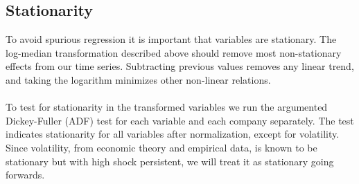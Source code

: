 \clearpage

\subsection*{Stationarity}

To avoid spurious regression it is important that variables are stationary. The log-median transformation described above should remove most non-stationary effects from our time series. Subtracting previous values removes any linear trend, and taking the logarithm minimizes other non-linear relations. 
\\\\
To test for stationarity in the transformed variables we run the argumented Dickey-Fuller (ADF) test for each variable and each company separately. The test indicates stationarity for all variables after normalization, except for volatility. Since volatility, from economic theory and empirical data, is known to be stationary but with high shock persistent, we will treat it as stationary going forwards. 









